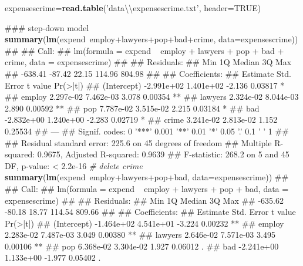 \documentclass[11pt,]{article}
\newenvironment{Shaded}{\begin{snugshade}}{\end{snugshade}}
\newcommand{\KeywordTok}[1]{\textcolor[rgb]{0.13,0.29,0.53}{\textbf{{#1}}}}
\newcommand{\DataTypeTok}[1]{\textcolor[rgb]{0.13,0.29,0.53}{{#1}}}
\newcommand{\CharTok}[1]{\textcolor[rgb]{0.31,0.60,0.02}{{#1}}}
\newcommand{\StringTok}[1]{\textcolor[rgb]{0.31,0.60,0.02}{{#1}}}
\newcommand{\CommentTok}[1]{\textcolor[rgb]{0.56,0.35,0.01}{\textit{{#1}}}}
\newcommand{\OtherTok}[1]{\textcolor[rgb]{0.56,0.35,0.01}{{#1}}}
\newcommand{\NormalTok}[1]{{#1}}
\begin{document}
\begin{Shaded}
\begin{Highlighting}[]
\NormalTok{expensescrime=}\KeywordTok{read.table}\NormalTok{(}\StringTok{'data}\CharTok{\textbackslash{}\textbackslash{}}\StringTok{expensescrime.txt'}\NormalTok{, }\DataTypeTok{header=}\OtherTok{TRUE}\NormalTok{)}

\NormalTok{### step-down model}
\KeywordTok{summary}\NormalTok{(}\KeywordTok{lm}\NormalTok{(expend~employ+lawyers+pop+bad+crime, }\DataTypeTok{data=}\NormalTok{expensescrime))}
\NormalTok{## }
\NormalTok{## Call:}
\NormalTok{## lm(formula = expend ~ employ + lawyers + pop + bad + crime, data = expensescrime)}
\NormalTok{## }
\NormalTok{## Residuals:}
\NormalTok{##     Min      1Q  Median      3Q     Max }
\NormalTok{## -638.41  -87.42   22.15  114.96  804.98 }
\NormalTok{## }
\NormalTok{## Coefficients:}
\NormalTok{##               Estimate Std. Error t value Pr(>|t|)   }
\NormalTok{## (Intercept) -2.991e+02  1.401e+02  -2.136  0.03817 * }
\NormalTok{## employ       2.297e-02  7.462e-03   3.078  0.00354 **}
\NormalTok{## lawyers      2.324e-02  8.044e-03   2.890  0.00592 **}
\NormalTok{## pop          7.787e-02  3.515e-02   2.215  0.03184 * }
\NormalTok{## bad         -2.832e+00  1.240e+00  -2.283  0.02719 * }
\NormalTok{## crime        3.241e-02  2.813e-02   1.152  0.25534   }
\NormalTok{## ---}
\NormalTok{## Signif. codes:  0 '***' 0.001 '**' 0.01 '*' 0.05 '.' 0.1 ' ' 1}
\NormalTok{## }
\NormalTok{## Residual standard error: 225.6 on 45 degrees of freedom}
\NormalTok{## Multiple R-squared:  0.9675, Adjusted R-squared:  0.9639 }
\NormalTok{## F-statistic: 268.2 on 5 and 45 DF,  p-value: < 2.2e-16}
\CommentTok{# delete crime}
\KeywordTok{summary}\NormalTok{(}\KeywordTok{lm}\NormalTok{(expend~employ+lawyers+pop+bad, }\DataTypeTok{data=}\NormalTok{expensescrime))}
\NormalTok{## }
\NormalTok{## Call:}
\NormalTok{## lm(formula = expend ~ employ + lawyers + pop + bad, data = expensescrime)}
\NormalTok{## }
\NormalTok{## Residuals:}
\NormalTok{##     Min      1Q  Median      3Q     Max }
\NormalTok{## -635.62  -80.18   18.77  114.54  809.66 }
\NormalTok{## }
\NormalTok{## Coefficients:}
\NormalTok{##               Estimate Std. Error t value Pr(>|t|)   }
\NormalTok{## (Intercept) -1.464e+02  4.541e+01  -3.224  0.00232 **}
\NormalTok{## employ       2.283e-02  7.487e-03   3.049  0.00380 **}
\NormalTok{## lawyers      2.646e-02  7.571e-03   3.495  0.00106 **}
\NormalTok{## pop          6.368e-02  3.304e-02   1.927  0.06012 . }
\NormalTok{## bad         -2.241e+00  1.133e+00  -1.977  0.05402 . }

\end{Highlighting}
\end{Shaded}
\end{document}
